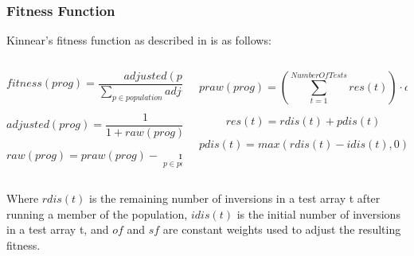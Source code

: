 \documentclass{beamer}
\begin{document}
		\begin{frame}
		
			\frametitle{Fitness Function}
			
			Kinnear's fitness function as described in \cite{kinnear_generality_1993} is as follows:
			
			
				\begin{columns}[T]
					
					\begin{column}{0.5\textwidth}
						
						\begin{tiny}
							
						$$fitness(prog) = \frac{adjusted(prog)}{\sum_{p\in population}^{}adjusted(p)}$$
						
						$$adjusted(prog) = \frac{1}{1 + raw(prog)}$$
						
						$$raw(prog) = praw(prog) - \min_{p\in population} praw(p)$$
						
						\end{tiny}
					
					
					\end{column}
					
					
					\begin{column}{0.5\textwidth}
						
						\begin{tiny}
						
						$$praw(prog) = \left(\sum_{t = 1}^{Number Of Tests}res(t)\right) \cdot of + size(prog) \cdot sf$$
						
						$$res(t) = rdis(t) + pdis(t)$$
						
						$$pdis(t) = max(rdis(t) - idis(t), 0) \cdot 100$$
						
						\end{tiny}
					\end{column}
				\end{columns}
			
			Where $rdis(t)$ is the remaining number of inversions in a test array t after running a member of the population, $idis(t)$ is the initial number of inversions in a test array t, and $of$ and $sf$ are constant weights used to adjust the resulting fitness.
		
		\end{frame}
	
\end{document}

